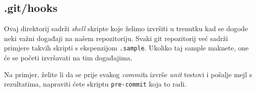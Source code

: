 \subsection*{.git/hooks}

Ovaj direktorij sadrži \emph{shell} skripte koje želimo izvršiti u trenutku kad se dogode neki važni događaji na našem repozitoriju.
Svaki git repozitorij već sadrži primjere takvih skripti s ekspenzijom \verb+.sample+.
Ukoliko taj sample maknete, one će se početi izvršavati na tim događajima.

Na primjer, želite li da se prije svakog \emph{commit}a izvrše \emph{unit} testovi i pošalje mejl s rezultatima, napraviti ćete skriptu \verb+pre-commit+ koja to radi.



